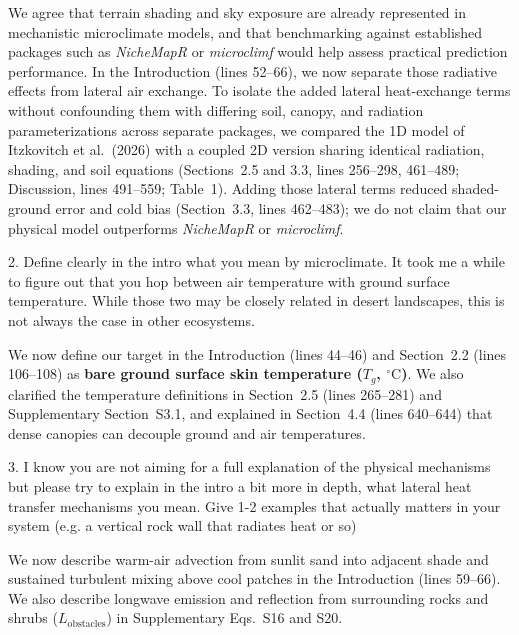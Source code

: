\documentclass[12pt,english]{reviewresponse}
\begin{document}
\begin{revresponse}
We agree that terrain shading and sky exposure are already represented in mechanistic microclimate models, and that benchmarking against established packages such as \textit{NicheMapR} or \textit{microclimf} would help assess practical prediction performance. In the Introduction (lines 52--66), we now separate those radiative effects from lateral air exchange. To isolate the added lateral heat-exchange terms without confounding them with differing soil, canopy, and radiation parameterizations across separate packages, we compared the 1D model of Itzkovitch et al.\ (2026) with a coupled 2D version sharing identical radiation, shading, and soil equations (Sections~2.5 and 3.3, lines 256--298, 461--489; Discussion, lines 491--559; Table~1). Adding those lateral terms reduced shaded-ground error and cold bias (Section~3.3, lines 462--483); we do not claim that our physical model outperforms \textit{NicheMapR} or \textit{microclimf}.
\end{revresponse}

\begin{revcomment}
2. Define clearly in the intro what you mean by microclimate. It took me a while to figure out that you hop between air temperature with ground surface temperature. While those two may be closely related in desert landscapes, this is not always the case in other ecosystems.
\end{revcomment}

\begin{revresponse}
We now define our target in the Introduction (lines 44--46) and Section~2.2 (lines 106--108) as \textbf{bare ground surface skin temperature ($T_g$, $^\circ\mathrm{C}$)}. We also clarified the temperature definitions in Section~2.5 (lines 265--281) and Supplementary Section~S3.1, and explained in Section~4.4 (lines 640--644) that dense canopies can decouple ground and air temperatures.
\end{revresponse}

\begin{revcomment}
3. I know you are not aiming for a full explanation of the physical mechanisms but please try to explain in the intro a bit more in depth, what lateral heat transfer mechanisms you mean. Give 1-2 examples that actually matters in your system (e.g. a vertical rock wall that radiates heat or so)
\end{revcomment}

\begin{revresponse}
We now describe warm-air advection from sunlit sand into adjacent shade and sustained turbulent mixing above cool patches in the Introduction (lines 59--66). We also describe longwave emission and reflection from surrounding rocks and shrubs ($L_{\text{obstacles}}$) in Supplementary Eqs.~S16 and S20.
\end{revresponse}
\end{document}
